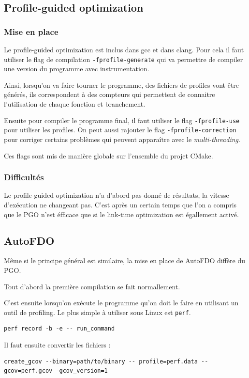 \documentclass[a4paper]{report}
\begin{document}
        \subsection{Profile-guided optimization}
            \subsubsection{Mise en place}
                Le profile-guided optimization est inclus dans gcc et dans clang.
                Pour cela il faut utiliser le flag de compilation \verb'-fprofile-generate' qui va permettre de compiler une version du programme avec instrumentation.

                Ainsi, lorsqu'on va faire tourner le programme, des fichiers de profiles vont être générés, ils correspondent à des compteurs qui permettent de connaitre l'utilisation de chaque fonction et branchement.

                Ensuite pour compiler le programme final, il faut utiliser le flag \verb'-fprofile-use' pour utiliser les profiles.
                On peut aussi rajouter le flag \verb'-fprofile-correction' pour corriger certains problèmes qui peuvent apparaître avec le \emph{multi-threading}.

                Ces flags sont mis de manière globale sur l'ensemble du projet CMake.

            \subsubsection{Difficultés}
                Le profile-guided optimization n'a d'abord pas donné de résultats, la vitesse d'exécution ne changeant pas.
                C'est après un certain temps que l'on a compris que le PGO n'est éfficace que si le link-time optimization est égallement activé.

        \subsection{AutoFDO}
            Même si le principe général est similaire, la mise en place de AutoFDO diffère du PGO.

            Tout d'abord la première compilation se fait normallement.

            C'est ensuite lorsqu'on exécute le programme qu'on doit le faire en utilisant un outil de profiling.
            Le plus simple à utiliser sous Linux est \verb'perf'.
            \begin{verbatim}
perf record -b -e -- run_command
            \end{verbatim}
            Il faut ensuite convertir les fichiers :
            \begin{verbatim}
create_gcov --binary=path/to/binary -- profile=perf.data --gcov=perf.gcov -gcov_version=1
            \end{verbatim}
\end{document}
